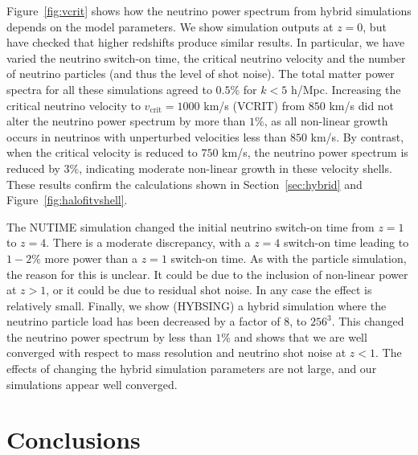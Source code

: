 \documentclass[useAMS, usenatbib]{mnras}
\begin{document}
Figure~\ref{fig:vcrit} shows how the neutrino power spectrum from hybrid simulations depends on the model parameters. We show simulation outputs at $z=0$, but have checked that higher redshifts produce similar results. In particular, we have varied the neutrino switch-on time, the critical neutrino velocity and the number of neutrino particles (and thus the level of shot noise). The total matter power spectra for all these simulations agreed to $0.5\%$ for $k < 5$ h/Mpc. Increasing the critical neutrino velocity to $v_\mathrm{crit} = 1000$ km/s (VCRIT) from $850$ km/s did not alter the neutrino power spectrum by more than $1\%$, as all non-linear growth occurs in neutrinos with unperturbed velocities less than $850$ km/s. By contrast, when the critical velocity is reduced to $750$ km/s, the neutrino power spectrum is reduced by $3\%$, indicating moderate non-linear growth in these velocity shells. These results confirm the calculations shown in Section~\ref{sec:hybrid} and Figure~\ref{fig:halofitvshell}.

The NUTIME simulation changed the initial neutrino switch-on time from $z=1$ to $z=4$. There is a moderate discrepancy, with a $z=4$ switch-on time leading to $1-2\%$ more power than a $z=1$ switch-on time. As with the particle simulation, the reason for this is unclear. It could be due to the inclusion of non-linear power at $z>1$, or it could be due to residual shot noise. In any case the effect is relatively small. Finally, we show (HYBSING) a hybrid simulation where the neutrino particle load has been decreased by a factor of $8$, to $256^3$. This changed the neutrino power spectrum by less than $1\%$ and shows that we are well converged with respect to mass resolution and neutrino shot noise at $z < 1$.
The effects of changing the hybrid simulation parameters are not large, and our simulations appear well converged.

\section{Conclusions}
\label{sec:conclusion}
\end{document}
